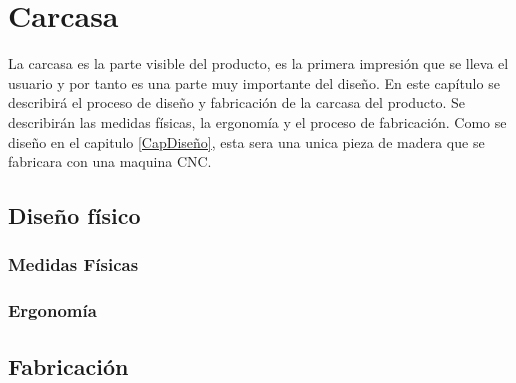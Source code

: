 \chapter{Carcasa}

La carcasa es la parte visible del producto, es la primera impresión que se lleva el usuario y por tanto es una parte muy importante del diseño. En este capítulo se describirá el proceso de diseño y fabricación de la carcasa del producto. Se describirán las medidas físicas, la ergonomía y el proceso de fabricación. Como se diseño en el capitulo \ref{CapDiseño}, esta sera una unica pieza de madera que se fabricara con una maquina CNC.

\section{Diseño físico}
\subsection{Medidas Físicas}
\subsection{Ergonomía}
\section{Fabricación}